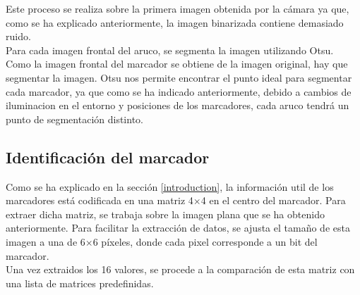 \documentclass{article}
\begin{document}
Este proceso se realiza sobre la primera imagen obtenida por la cámara ya que, como se ha explicado anteriormente, la imagen binarizada contiene demasiado ruido.\\

Para cada imagen frontal del aruco, se segmenta la imagen utilizando Otsu. Como la imagen frontal del marcador se obtiene de la imagen original, hay que segmentar la imagen. Otsu nos permite encontrar el punto ideal para segmentar cada marcador, ya que como se ha indicado anteriormente, debido a cambios de iluminacion en el entorno y posiciones de los marcadores, cada aruco tendrá un punto de segmentación distinto.

\subsection{Identificación del marcador}
Como se ha explicado en la sección \ref{introduction}, la información util de los marcadores está codificada en una matriz 4$\times$4 en el centro del marcador.
Para extraer dicha matriz, se trabaja sobre la imagen plana que se ha obtenido anteriormente. Para facilitar la extracción de datos, se ajusta el tamaño de esta imagen a una de 6$\times$6 píxeles, donde cada pixel corresponde a un bit del marcador.\\

Una vez extraidos los 16 valores, se procede a la comparación de esta matriz con una lista de matrices predefinidas.
\end{document}
